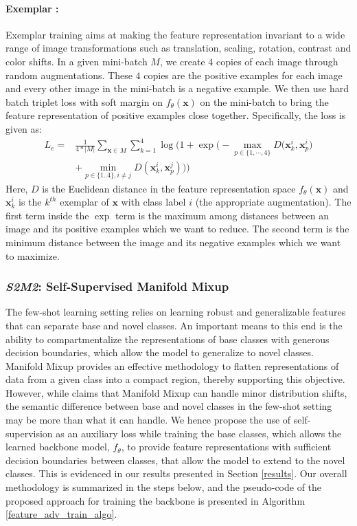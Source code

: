 \documentclass[10pt,twocolumn,letterpaper]{article}
\begin{document}
\paragraph{Exemplar \cite{exemplar2014}:}
Exemplar training aims at making the feature representation invariant to a wide range of image transformations such as translation, scaling, rotation, contrast and color shifts. In a given mini-batch $M$, we create $4$ copies of each image through random augmentations. These $4$ copies are the positive examples for each image and every other image in the mini-batch is a negative example. We then use hard batch triplet loss  \cite{hardbatchtripletloss} with soft margin on $f_{\theta}(\textbf{x})$ on the mini-batch to bring the feature representation of positive examples close together. Specifically, the loss is given as:
\begin{equation}
\begin{aligned}
    L_{e} = & \frac{1}{4*|M|} \sum_{\textbf{x}\in M } \sum_{k=1}^{4} \log \bigg(1 + \exp\big(- \max_{p \in \{1,\cdots,4\}} D\big(\textbf{x}_k^i,\textbf{x}_p^i\big) \\
    & + \min_{p \in \{1..4\}, i \neq j}
        D(\textbf{x}_k^i,\textbf{x}_p^j)\big) \bigg)
\end{aligned}
\label{eqn_exemplar_selfsup_loss}
\end{equation}
Here, $D$ is the Euclidean distance in the feature representation space $f_\theta(\textbf{x})$ and $\textbf{x}_k^i$ is the $k^{th}$ exemplar of $\textbf{x}$ with class label $i$ (the appropriate augmentation). The first term inside the $\exp$ term is the maximum among distances between an image and its positive examples which we want to reduce. The second term is the minimum distance between the image and its negative examples which we want to maximize. 
\subsubsection{\textit{S2M2}: Self-Supervised Manifold Mixup}
\label{ourapproach}
The few-shot learning setting relies on learning robust and generalizable features that can separate base and novel classes. An important means to this end is the ability to compartmentalize the representations of base classes with generous decision boundaries, which allow the model to generalize to novel classes. Manifold Mixup provides an effective methodology to flatten representations of data from a given class into a compact region, thereby supporting this objective. However, while \cite{verma2019manifold} claims that Manifold Mixup can handle minor distribution shifts, the semantic difference between base and novel classes in the few-shot setting may be more than what it can handle. We hence propose the use of self-supervision as an auxiliary loss while training the base classes, which allows the learned backbone model, $f_{\theta}$, to provide feature representations with sufficient decision boundaries between classes, that allow the model to extend to the novel classes. This is evidenced in our results presented in Section \ref{results}. Our overall methodology is summarized in the steps below, and the pseudo-code of the proposed approach for training the backbone is presented in Algorithm \ref{feature_adv_train_algo}.
\end{document}
